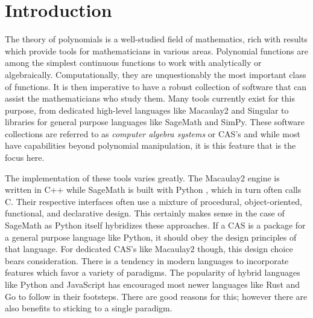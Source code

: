 \documentclass[MS, xcolor=dvipsnames]{wfuthesis}
\theoremstyle{definition}
\begin{document}
\chapters


\chapter{Introduction}
The theory of polynomials is a well-studied field of mathematics, rich with results which provide tools for mathematicians in various areas. Polynomial functions are among the simplest continuous functions to work with analytically or algebraically. Computationally, they are unquestionably the most important class of functions. It is then imperative to have a robust collection of software that can assist the mathematicians who study them. Many tools currently exist for this purpose, from dedicated high-level languages like Macaulay2 and Singular to libraries for general purpose languages like SageMath and SimPy. These software collections are referred to as \textit{computer algebra systems} or CAS's and while most have capabilities beyond polynomial manipulation, it is this feature that is the focus here. \par
The implementation of these tools varies greatly. The Macaulay2 engine is written in C++ \cite{M2} while SageMath is built with Python \cite{SageMath}, which in turn often calls C. Their respective interfaces often use a mixture of procedural, object-oriented, functional, and declarative design. This certainly makes sense in the case of SageMath as Python itself hybridizes these approaches. If a CAS is a package for a general purpose language like Python, it should obey the design principles of that language. For dedicated CAS's like Macaulay2 though, this design choice bears consideration. There is a tendency in modern languages to incorporate features which favor a variety of paradigms. The popularity of hybrid languages like Python and JavaScript has encouraged most newer languages like Rust and Go to follow in their footsteps. There are good reasons for this; however there are also benefits to sticking to a single paradigm. \par
\end{document}
